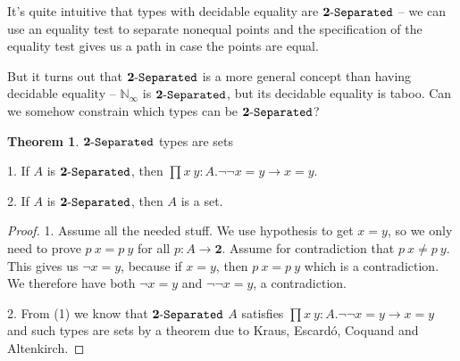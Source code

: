\documentclass[11pt]{article}
\theoremstyle{definition}
\newtheorem{theorem}{Theorem}[section]
\renewcommand{\(}{\left(}
\renewcommand{\)}{\right)}
\newcommand{\apl}[2]{#1\ #2}
\newcommand{\Bool}{\mathbf{2}}
\newcommand{\Conat}{\mathbb{N}_\infty}
\newcommand{\dprod}[2]{\prod #1.#2}
\begin{document}
It's quite intuitive that types with decidable equality are $\Separated{\Bool}$ -- we can use an equality test to separate nonequal points and the specification of the equality test gives us a path in case the points are equal.

But it turns out that $\Separated{\Bool}$ is a more general concept than having decidable equality -- $\Conat$ is $\Separated{\Bool}$, but its decidable equality is taboo. Can we somehow constrain which types can be $\Separated{\Bool}$?

\begin{theorem} $\Separated{\Bool}$ types are sets

1. If $A$ is $\Separated{\Bool}$, then $\dprod{x\ y : A}{\neg\neg x = y \to x = y}$.

2. If $A$ is $\Separated{\Bool}$, then $A$ is a set.

\end{theorem}
\begin{proof}
1. Assume all the needed stuff. We use hypothesis to get $x = y$, so we only need to prove $\apl{p}{x} = \apl{p}{y}$ for all $p : A \to \Bool$. Assume for contradiction that $\apl{p}{x} \neq \apl{p}{y}$. This gives us $\neg x = y$, because if $x = y$, then $\apl{p}{x} = \apl{p}{y}$ which is a contradiction. We therefore have both $\neg x = y$ and $\neg\neg x = y$, a contradiction.

2. From (1) we know that $\Separated{\Bool}$ $A$ satisfies $\dprod{x\ y : A}{\neg\neg x = y \to x = y}$ and such types are sets by a theorem due to Kraus, Escard\'{o}, Coquand and Altenkirch.
\end{proof}
\end{document}
